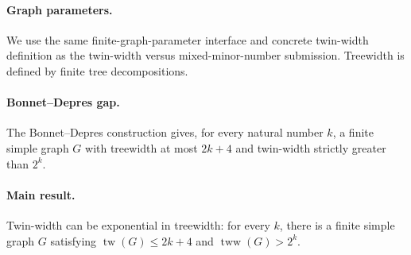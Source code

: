 \paragraph{Graph parameters.}
We use the same finite-graph-parameter interface and concrete twin-width definition as the twin-width versus mixed-minor-number submission.  Treewidth is defined by finite tree decompositions.

\paragraph{Bonnet--Depres gap.}
The Bonnet--Depres construction gives, for every natural number $k$, a finite simple graph $G$ with treewidth at most $2k+4$ and twin-width strictly greater than $2^k$.

\paragraph{Main result.}
Twin-width can be exponential in treewidth: for every $k$, there is a finite simple graph $G$ satisfying $\operatorname{tw}(G) \le 2k+4$ and $\operatorname{tww}(G) > 2^k$.
